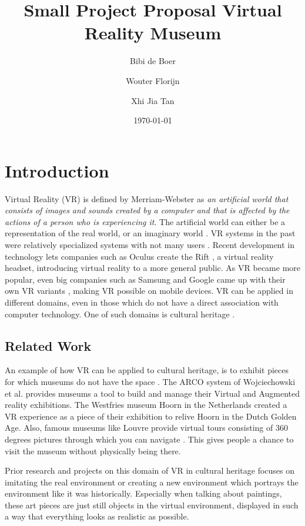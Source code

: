 \documentclass[a4paper]{article}
\title{Small Project Proposal Virtual Reality Museum}
\author{Bibi de Boer \and Wouter Florijn \and Xhi Jia Tan}
\date{\today}
\begin{document}
\maketitle

\section{Introduction}

Virtual Reality (VR) is defined by Merriam-Webster \cite{merriam} as \emph{an artificial world that consists of images and sounds created by a computer and that is affected by the actions of a person who is experiencing it}. The artificial world can either be a representation of the real world, or an imaginary world \cite{martens}. VR systems in the past were relatively specialized systems with not many users \cite{martens}. Recent development in technology lets companies such as Oculus create the Rift \cite{oculus}, a virtual reality headset, introducing virtual reality to a more general public. As VR became more popular, even big companies such as Samsung and Google came up with their own VR variants \cite{gearvr, cardboard}, making VR possible on mobile devices. VR can be applied in different domains, even in those which do not have a direct association with computer technology. One of such domains is cultural heritage \cite{wojciechowski}.


\subsection{Related Work}
An example of how VR can be applied to cultural heritage, is to exhibit pieces for which museums do not have the space \cite{wojciechowski}. The ARCO system of Wojciechowski et al. \cite{wojciechowski} provides museums a tool to build and manage their Virtual and Augmented reality exhibitions. The Westfries museum Hoorn in the Netherlands created a VR experience \cite{westfries} as a piece of their exhibition to relive Hoorn in the Dutch Golden Age. Also, famous museums like Louvre provide virtual tours consisting of 360 degrees pictures through which you can navigate \cite{louvre}. This gives people a chance to visit the museum without physically being there.

Prior research and projects on this domain of VR in cultural heritage focuses on imitating the real environment or creating a new environment which portrays the environment like it was historically. Especially when talking about paintings, these art pieces are just still objects in the virtual environment, displayed in such a way that everything looks as realistic as possible.
\end{document}
